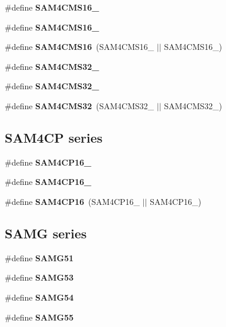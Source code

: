 \begin{DoxyCompactItemize}
\item 
\#define {\bfseries S\+A\+M4\+C\+M\+S16\+\_}
\item 
\#define {\bfseries S\+A\+M4\+C\+M\+S16\+\_}
\item 
\hypertarget{group__sam__part__macros__group_gab78e397a8bc78b392f77abb18bbfa582}{}\#define {\bfseries S\+A\+M4\+C\+M\+S16}~(S\+A\+M4\+C\+M\+S16\+\_ $\vert$$\vert$ S\+A\+M4\+C\+M\+S16\+\_)\label{group__sam__part__macros__group_gab78e397a8bc78b392f77abb18bbfa582}

\item 
\#define {\bfseries S\+A\+M4\+C\+M\+S32\+\_}
\item 
\#define {\bfseries S\+A\+M4\+C\+M\+S32\+\_}
\item 
\hypertarget{group__sam__part__macros__group_gaeb53c0522eaadff13c8ec90644ac8721}{}\#define {\bfseries S\+A\+M4\+C\+M\+S32}~(S\+A\+M4\+C\+M\+S32\+\_ $\vert$$\vert$ S\+A\+M4\+C\+M\+S32\+\_)\label{group__sam__part__macros__group_gaeb53c0522eaadff13c8ec90644ac8721}

\end{DoxyCompactItemize}
\subsection*{S\+A\+M4\+C\+P series}
\begin{DoxyCompactItemize}
\item 
\#define {\bfseries S\+A\+M4\+C\+P16\+\_}
\item 
\#define {\bfseries S\+A\+M4\+C\+P16\+\_}
\item 
\hypertarget{group__sam__part__macros__group_gafd1c94764b607ffb18e6a495e5486659}{}\#define {\bfseries S\+A\+M4\+C\+P16}~(S\+A\+M4\+C\+P16\+\_ $\vert$$\vert$ S\+A\+M4\+C\+P16\+\_)\label{group__sam__part__macros__group_gafd1c94764b607ffb18e6a495e5486659}

\end{DoxyCompactItemize}
\subsection*{S\+A\+M\+G series}
\begin{DoxyCompactItemize}
\item 
\#define {\bfseries S\+A\+M\+G51}
\item 
\#define {\bfseries S\+A\+M\+G53}
\item 
\#define {\bfseries S\+A\+M\+G54}
\item 
\#define {\bfseries S\+A\+M\+G55}
\end{DoxyCompactItemize}

